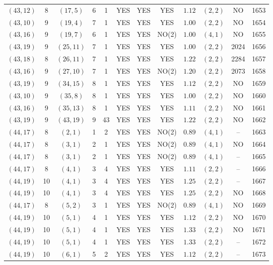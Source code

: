 \begin{longtable}{|c|c|c|c|c|c|c|c|c|c|c|c|}
$(43,12)$ & 8 & $(17,5)$ & 6 & 1 & YES & YES & YES & $1.12$ & $(2,2)$ & NO & 1653\\
$(43,10)$ & 9 & $(19,4)$ & 7 & 1 & YES & YES & YES & $1.00$ & $(2,2)$ & NO & 1654\\
$(43,16)$ & 9 & $(19,7)$ & 6 & 1 & YES & YES & NO(2) & $1.00$ & $(4,1)$ & NO & 1655\\
$(43,19)$ & 9 & $(25,11)$ & 7 & 1 & YES & YES & YES & $1.00$ & $(2,2)$ & 2024 & 1656\\
$(43,18)$ & 8 & $(26,11)$ & 7 & 1 & YES & YES & YES & $1.22$ & $(2,2)$ & 2284 & 1657\\
$(43,16)$ & 9 & $(27,10)$ & 7 & 1 & YES & YES & NO(2) & $1.20$ & $(2,2)$ & 2073 & 1658\\
$(43,19)$ & 9 & $(34,15)$ & 8 & 1 & YES & YES & YES & $1.12$ & $(2,2)$ & NO & 1659\\
$(43,10)$ & 9 & $(35,8)$ & 8 & 1 & YES & YES & YES & $1.00$ & $(2,2)$ & NO & 1660\\
$(43,16)$ & 9 & $(35,13)$ & 8 & 1 & YES & YES & YES & $1.11$ & $(2,2)$ & NO & 1661\\
$(43,19)$ & 9 & $(43,19)$ & 9 & 43 & YES & YES & YES & $1.22$ & $(2,2)$ & NO & 1662\\
$(44,17)$ & 8 & $(2,1)$ & 1 & 2 & YES & YES & NO(2) & $0.89$ & $(4,1)$ & -- & 1663\\
$(44,17)$ & 8 & $(3,1)$ & 2 & 1 & YES & YES & NO(2) & $0.89$ & $(4,1)$ & NO & 1664\\
$(44,17)$ & 8 & $(3,1)$ & 2 & 1 & YES & YES & NO(2) & $0.89$ & $(4,1)$ & -- & 1665\\
$(44,17)$ & 8 & $(4,1)$ & 3 & 4 & YES & YES & YES & $1.11$ & $(2,2)$ & -- & 1666\\
$(44,19)$ & 10 & $(4,1)$ & 3 & 4 & YES & YES & YES & $1.25$ & $(2,2)$ & -- & 1667\\
$(44,19)$ & 10 & $(4,1)$ & 3 & 4 & YES & YES & YES & $1.25$ & $(2,2)$ & NO & 1668\\
$(44,17)$ & 8 & $(5,2)$ & 3 & 1 & YES & YES & NO(2) & $0.89$ & $(4,1)$ & NO & 1669\\
$(44,19)$ & 10 & $(5,1)$ & 4 & 1 & YES & YES & YES & $1.12$ & $(2,2)$ & NO & 1670\\
$(44,19)$ & 10 & $(5,1)$ & 4 & 1 & YES & YES & YES & $1.33$ & $(2,2)$ & NO & 1671\\
$(44,19)$ & 10 & $(5,1)$ & 4 & 1 & YES & YES & YES & $1.33$ & $(2,2)$ & -- & 1672\\
$(44,19)$ & 10 & $(6,1)$ & 5 & 2 & YES & YES & YES & $1.12$ & $(2,2)$ & -- & 1673\\

\end{longtable}
